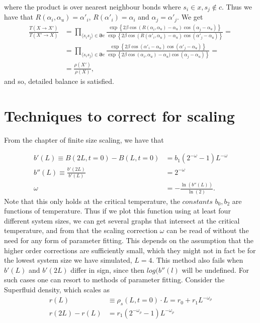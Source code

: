 where the product is over nearest neighbour bonds where $s_i \in x, s_j \notin c$.
Thus we have that $ R(\alpha_i,\alpha_u) = \alpha'_i $, $R(\alpha'_i) = \alpha_i$ and $\alpha_j = \alpha'_j$.
We get
\begin{align}
  \frac{T(X\rightarrow X')}{T(X'\rightarrow X)}&= \prod_{\langle s_i s_j \rangle \in \bm{\partial} c} \frac{ \exp\left\{2\beta\cos(R(\alpha_i,\alpha_u) - \alpha_u)\cos(\alpha_j - \alpha_u)\right\}}{ \exp\left\{2\beta\cos(R(\alpha'_i,\alpha_u) - \alpha_u)\cos(\alpha'_j -\alpha_u)\right\}} = \\
  &= \prod_{\langle s_i s_j \rangle \in \bm{\partial} c} \frac{ \exp\left\{2\beta\cos(\alpha'_i - \alpha_u)\cos(\alpha'_j - \alpha_u)\right\}}{ \exp\left\{2\beta\cos(\alpha_i,\alpha_u) - \alpha_u)\cos(\alpha_j -\alpha_u)\right\}} = \\
  &= \frac{\rho(X')}{\rho(X)},
\end{align}
and so, detailed balance is satisfied.

\section{Techniques to correct for scaling}
From the chapter of finite size scaling, we have that

\begin{align}
  b'(L) \equiv B(2L,t=0) - B(L,t=0) &= b_1(2^{-\omega} -1)L^{-\omega}\\
  b''(L)\equiv \frac{b'(2L)}{b'(L)} &= 2^{-\omega}\\
  \omega &= -\frac{\ln(b''(L))}{\ln(2)}.
\end{align}
Note that this only holds at the critical temperature, the $\textit{constants}$ $b_0, b_2$ are functions of temperature. Thus if we plot this function using at least four different system sizes, we can get several graphs that intersect at the critical temperature, and from that the scaling correction $\omega$ can be read of without the need for any form of parameter fitting. This depends on the assumption that the higher order corrections are sufficiently small, which they might not in fact be for the lowest system size we have simulated, $L=4$. This method also fails when $b'(L)$ and $b'(2L)$ differ in sign, since then $log(b''(l)$ will be undefined.
For such cases one can resort to methods of parameter fitting.
Consider the Superfluid density, which scales as 
\begin{align}
  r(L)&\equiv \rho_s(L,t=0) \cdot L = r_0 + r_1L^{-\omega_\rho}\\
  r(2L) - r(L) &= r_1(2^{-\omega_\rho} -1)L^{-\omega_\rho}
\end{align}


